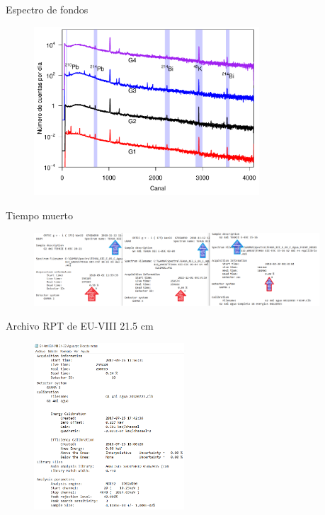 \documentclass[9pt]{beamer}
\begin{document}
\begin{frame}[noframenumbering]{Espectro de fondos}
\begin{figure}
\includegraphics[width=0.75\textwidth]{Imagenes/Fondos.pdf}
\end{figure}
	\begin{flushright}
	\hyperlink{Portada}{}
	\end{flushright}
\end{frame}

\begin{frame}[noframenumbering]{Tiempo muerto}
\begin{figure}
\includegraphics[width=0.95\textwidth]{Imagenes/TiempoMuerto.png}
\end{figure}
	\begin{flushright}
	\hyperlink{Portada}{\beamerbutton{Portada}}
	\end{flushright}
\end{frame}

\begin{frame}[noframenumbering]{Archivo RPT de EU-VIII 21.5 cm}
\begin{figure}
\includegraphics[width=0.5\textwidth]{Imagenes/InformationEUVIII.png}
\end{figure}
	\begin{flushright}
	\hyperlink{Portada}{}
	\end{flushright}
\end{frame}
\end{document}
